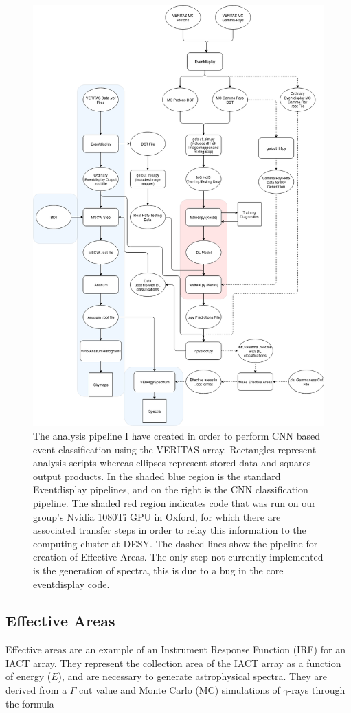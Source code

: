 \begin{figure}[] 
        \centering \includegraphics[width=0.75\columnwidth]{figures/Gettingout.png}

        \caption{
                \label{fig:Gettingout} The analysis pipeline I have created in order to perform CNN based event classification using the VERITAS array. Rectangles represent analysis scripts whereas ellipses represent stored data and squares output products. In the shaded blue region is the standard Eventdisplay pipelines, and on the right is the CNN classification pipeline. The shaded red region indicates code that was run on our group's Nvidia 1080Ti GPU in Oxford, for which there are associated transfer steps in order to relay this information to the computing cluster at DESY. The dashed lines show the pipeline for creation of Effective Areas. The only step not currently implemented is the generation of spectra, this is due to a bug in the core eventdisplay code.
        }
\end{figure}

\subsection{Effective Areas}
Effective areas are an example of an Instrument Response Function (IRF) for an IACT array. They represent the collection area of the IACT array as a function of energy ($E$), and are necessary to generate astrophysical spectra. They are derived from a $\Gamma$ cut value and Monte Carlo (MC) simulations of $\gamma$-rays through the formula

